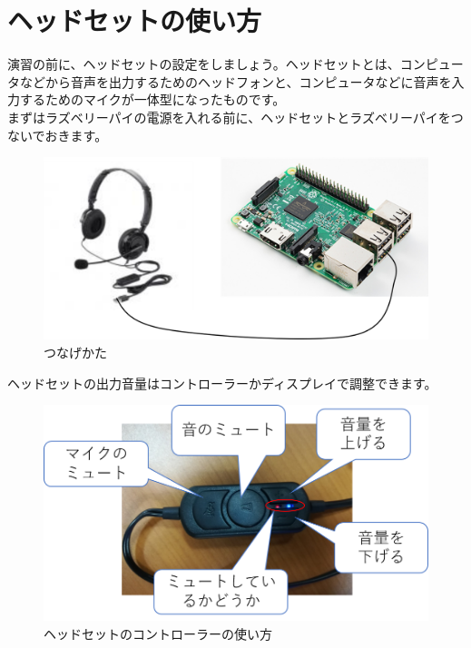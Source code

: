 \section{ヘッドセットの使い方}
演習の前に、ヘッドセットの設定をしましょう。ヘッドセットとは、コンピュータなどから音声を出力するためのヘッドフォンと、コンピュータなどに音声を入力するためのマイクが一体型になったものです。\\
まずはラズベリーパイの電源を入れる前に、ヘッドセットとラズベリーパイをつないでおきます。

\begin{figure}[H]
\begin{center}
    \includegraphics[width=\linewidth]{images/chap06/text06-img003.png}
    \caption{つなげかた}
    \label{つなげかた}
\end{center}
\end{figure}

ヘッドセットの出力音量はコントローラーかディスプレイで調整できます。

\begin{figure}[H]
\begin{center}
    \includegraphics[width=\linewidth]{images/chap06/text06-img004.png}
    \caption{ヘッドセットのコントローラーの使い方}
    \label{ヘッドセットのコントローラーの使い方}
\end{center}
\end{figure}

